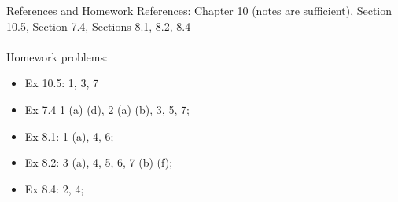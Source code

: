 \documentclass{./../../Latex/teaching_slides}
\begin{document}
%
%
%
%
%
%
%
%


\begin{frame}{References and Homework}
References: Chapter 10 (notes are sufficient), Section 10.5, Section 7.4, Sections 8.1, 8.2, 8.4 \\~\\
 Homework problems: \\
  \begin{itemize}
  \normalsize
  	\item Ex 10.5: 1, 3, 7
    \item Ex 7.4 1 (a) (d), 2 (a) (b), 3, 5, 7;
    \item Ex 8.1: 1 (a), 4, 6; 
  	\item Ex 8.2: 3 (a), 4, 5, 6, 7 (b) (f); 
  	\item Ex 8.4: 2, 4; 
  	\end{itemize}
\end{frame}
\end{document}
